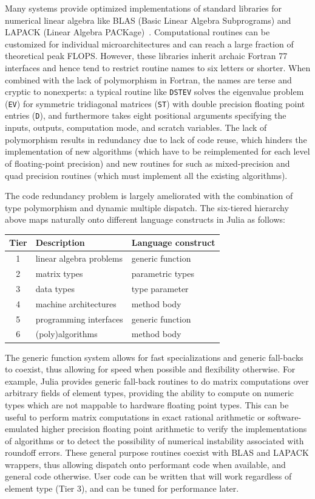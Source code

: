 \documentclass[10pt, preprint]{sigplanconf}
\begin{document}
Many systems provide optimized implementations of standard libraries for
numerical linear algebra like BLAS (Basic Linear Algebra Subprograms) and
LAPACK (Linear Algebra PACKage)~\cite{lapack}. Computational routines can be
customized for individual microarchitectures and can reach a large fraction of
theoretical peak FLOPS. However, these libraries inherit archaic Fortran 77
interfaces and hence tend to restrict routine names to six letters or shorter.
When combined with the lack of polymorphism in Fortran, the names are terse and
cryptic to nonexperts: a typical routine like \verb|DSTEV| solves the
eigenvalue problem (\verb|EV|) for symmetric tridiagonal matrices (\verb|ST|)
with double precision floating point entries (\verb|D|), and furthermore takes
eight positional arguments specifying the inputs, outputs, computation mode,
and scratch variables. The lack of polymorphism results in redundancy due to
lack of code reuse, which hinders the implementation of new algorithms (which
have to be reimplemented for each level of floating-point precision) and new
routines for such as mixed-precision and quad precision routines (which must
implement all the existing algorithms).

The code redundancy problem is largely ameliorated with the combination of type
polymorphism and dynamic multiple dispatch. The six-tiered hierarchy above maps
naturally onto different language constructs in Julia as follows:

\vspace{12pt}
\begin{tabular}{c l l}
	\hline
	Tier & Description & Language construct \\ \hline
	1 & linear algebra problems & generic function \\
	2 & matrix types & parametric types \\
	3 & data types & type parameter \\
	4 & machine architectures & method body \\
	5 & programming interfaces & generic function \\
	6 & (poly)algorithms & method body \\ \hline
\end{tabular}
\vspace{12pt}

The generic function system allows for fast specializations and generic
fall-backs to coexist, thus allowing for speed when possible and flexibility
otherwise. For example, Julia provides generic fall-back routines to do matrix
computations over arbitrary fields of element types, providing the ability to
compute on numeric types which are not mappable to hardware floating point
types. This can be useful to perform matrix computations in exact rational
arithmetic or software-emulated higher precision floating point arithmetic to
verify the implementations of algorithms or to detect the possibility of
numerical instability associated with roundoff errors. These general purpose
routines coexist with BLAS and LAPACK wrappers, thus allowing dispatch onto
performant code when available, and general code otherwise. User code can be
written that will work regardless of element type (Tier 3), and can be tuned
for performance later.
\end{document}
